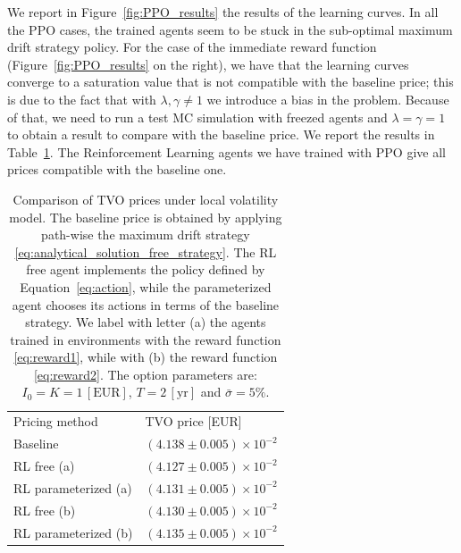\documentclass[11pt]{article}
\begin{document}
We report in Figure~\ref{fig:PPO_results} the results of the learning curves. In all the PPO cases, the trained agents seem to be stuck in the sub-optimal maximum drift strategy policy. For the case of the immediate reward function (Figure~\ref{fig:PPO_results} on the right), we have that the learning curves converge to a saturation value that is not compatible with the baseline price; this is due to the fact that with $\lambda,\gamma \neq 1$ we introduce a bias in the problem. Because of that, we need to run a test MC simulation with freezed agents and $\lambda=\gamma=1$ to obtain a result to compare with the baseline price. We report the results in Table~\ref{tab:mc_results_lv}. The Reinforcement Learning agents we have trained with PPO give all prices compatible with the baseline one.
\begin{table}
\begin{center}
\begin{tabular}{ll}
\hline\noalign{\smallskip}
Pricing method & TVO price [EUR] \\
\noalign{\smallskip}
\hline
\noalign{\smallskip}
Baseline &  $(4.138 \pm 0.005)\times 10^{-2}$\\
RL free (a) & $(4.127 \pm 0.005) \times 10^{-2}$ \\
RL parameterized (a) & $(4.131 \pm 0.005) \times 10^{-2}$ \\
RL free (b) & $(4.130 \pm 0.005) \times 10^{-2}$ \\
RL parameterized (b) & $(4.135 \pm 0.005) \times 10^{-2}$ \\
\hline
\end{tabular}
\caption{Comparison of TVO prices under local volatility model. The baseline price is obtained by applying path-wise the maximum drift strategy \eqref{eq:analytical_solution_free_strategy}. The RL free agent implements the policy defined by Equation~\eqref{eq:action}, while the parameterized agent chooses its actions in terms of the baseline strategy. We label with letter (a) the agents trained in environments with the reward function \eqref{eq:reward1}, while with (b) the reward function \eqref{eq:reward2}. The option parameters are: $I_0=K=1\,[\text{EUR}]$, $T=2\,[\text{yr}]$ and $\bar{\sigma}=5\%$.}
\label{tab:mc_results_lv}
\end{center}
\end{table}
\setlength{\tabcolsep}{1.4pt}
\end{document}
